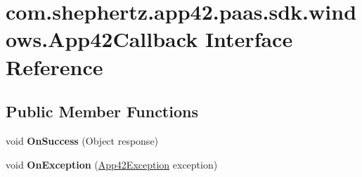 \hypertarget{interfacecom_1_1shephertz_1_1app42_1_1paas_1_1sdk_1_1windows_1_1_app42_callback}{\section{com.\+shephertz.\+app42.\+paas.\+sdk.\+windows.\+App42\+Callback Interface Reference}
\label{interfacecom_1_1shephertz_1_1app42_1_1paas_1_1sdk_1_1windows_1_1_app42_callback}
}
\subsection*{Public Member Functions}
\begin{DoxyCompactItemize}
\item 
\hypertarget{interfacecom_1_1shephertz_1_1app42_1_1paas_1_1sdk_1_1windows_1_1_app42_callback_af97e29d5587d7e1737f133b8fe6c7835}{void {\bfseries On\+Success} (Object response)}\label{interfacecom_1_1shephertz_1_1app42_1_1paas_1_1sdk_1_1windows_1_1_app42_callback_af97e29d5587d7e1737f133b8fe6c7835}

\item 
\hypertarget{interfacecom_1_1shephertz_1_1app42_1_1paas_1_1sdk_1_1windows_1_1_app42_callback_a6cdd3c1ad91b6c8991df9f9867602443}{void {\bfseries On\+Exception} (\hyperlink{classcom_1_1shephertz_1_1app42_1_1paas_1_1sdk_1_1windows_1_1_app42_exception}{App42\+Exception} exception)}\label{interfacecom_1_1shephertz_1_1app42_1_1paas_1_1sdk_1_1windows_1_1_app42_callback_a6cdd3c1ad91b6c8991df9f9867602443}

\end{DoxyCompactItemize}
